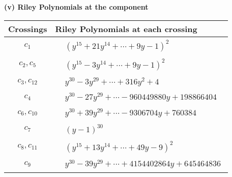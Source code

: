 \documentclass[1p]{elsarticle_modified}
\theoremstyle{definition}
\begin{document}
\newpage\renewcommand{\arraystretch}{1}
\flushleft \textbf{(v) Riley Polynomials at the component}\newline \\
\begin{tabular}{m{50pt}|m{274pt}}
Crossings & \hspace{64pt}Riley Polynomials at each crossing \\
\hline $$\begin{aligned}c_{1}\end{aligned}$$&$\begin{aligned}
&(y^{15}+21 y^{14}+\cdots+9 y-1)^{2}
\end{aligned}$\\
\hline $$\begin{aligned}c_{2},c_{5}\end{aligned}$$&$\begin{aligned}
&(y^{15}-3 y^{14}+\cdots+9 y-1)^{2}
\end{aligned}$\\
\hline $$\begin{aligned}c_{3},c_{12}\end{aligned}$$&$\begin{aligned}
&y^{30}-3 y^{29}+\cdots+316 y^2+4
\end{aligned}$\\
\hline $$\begin{aligned}c_{4}\end{aligned}$$&$\begin{aligned}
&y^{30}-27 y^{29}+\cdots-960449880 y+198866404
\end{aligned}$\\
\hline $$\begin{aligned}c_{6},c_{10}\end{aligned}$$&$\begin{aligned}
&y^{30}+39 y^{29}+\cdots-9306704 y+760384
\end{aligned}$\\
\hline $$\begin{aligned}c_{7}\end{aligned}$$&$\begin{aligned}
&(y-1)^{30}
\end{aligned}$\\
\hline $$\begin{aligned}c_{8},c_{11}\end{aligned}$$&$\begin{aligned}
&(y^{15}+13 y^{14}+\cdots+49 y-9)^{2}
\end{aligned}$\\
\hline $$\begin{aligned}c_{9}\end{aligned}$$&$\begin{aligned}
&y^{30}-39 y^{29}+\cdots+4154402864 y+645464836
\end{aligned}$\\
\hline
\end{tabular}\\~\\
\end{document}
